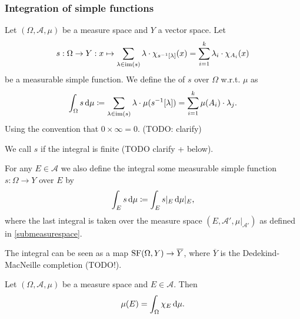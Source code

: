 \subsubsection{Integration of simple functions}
\begin{definition}
Let $(\Omega, \mathcal{A}, \mu)$ be a measure space and $Y$ a vector space. Let
\[ s:\Omega \to Y: x\mapsto \sum_{\lambda \in \operatorname{im}(s)}\lambda\cdot \chi_{s^{-1}[\lambda]}(x) = \sum_{i=1}^k\lambda_i\cdot\chi_{A_i}(x)  \]
be a measurable simple function. We define the  of $s$ over $\Omega$ w.r.t. $\mu$ as
\[ \int_\Omega s\operatorname{d \!}{\mu} \coloneqq \sum_{\lambda \in \operatorname{im}(s)}\lambda\cdot \mu(s^{-1}[\lambda]) = \sum_{i=1}^k\mu(A_i)\cdot\lambda_j. \]
Using the convention that $0\times \infty = 0$. (TODO: clarify)

We call $s$  if the integral is finite (TODO clarify + below).

For any $E\in\mathcal{A}$ we also define the integral some measurable simple function $s:\Omega\to Y$ over $E$ by
\[ \int_E s \operatorname{d \!}{\mu} \coloneqq \int_E s|_E \operatorname{d \!}{\mu|_E}, \]
where the last integral is taken over the measure space $(E,\mathcal{A}',\mu|_{\mathcal{A}'})$ as defined in \ref{submeasurespace}.
\end{definition}

The integral can be seen as a map $\operatorname{SF}(\Omega,Y)\to \overline{Y}$, where $\overline{Y}$ is the Dedekind-MacNeille completion (TODO!).

\begin{lemma} \label{measureFromIntegralCharacteristicFunctions}
Let $(\Omega, \mathcal{A}, \mu)$ be a measure space and $E\in\mathcal{A}$. Then
\[ \mu(E) = \int_\Omega \chi_E \operatorname{d \!}{\mu}. \]
\end{lemma}

